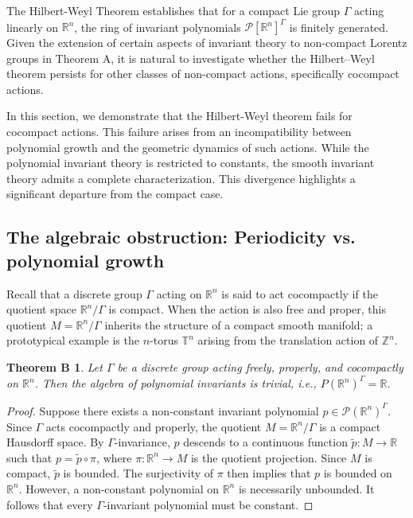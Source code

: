 \documentclass[]{article}
\newtheorem*{theoremB}{Theorem B}
\begin{document}
The Hilbert-Weyl Theorem establishes that for a compact Lie group $\Gamma$ acting linearly on $\mathbb{R}^n$, the ring of invariant polynomials $\mathcal{P}[\mathbb{R}^n]^\Gamma$ is finitely generated. Given the extension of certain aspects of invariant theory to non-compact Lorentz groups in Theorem A, it is natural to investigate whether the Hilbert–Weyl theorem persists for other classes of non-compact actions, specifically cocompact actions.

In this section, we demonstrate that the Hilbert-Weyl theorem fails for cocompact actions. This failure arises from an incompatibility between polynomial growth and the geometric dynamics of such actions. While the polynomial invariant theory is restricted to constants, the smooth invariant theory admits a complete characterization. This divergence highlights a significant departure from the compact case.

\subsection{The algebraic obstruction: Periodicity vs. polynomial growth}

Recall that a discrete group $\Gamma$ acting on $\mathbb{R}^n$ is said to act cocompactly if the quotient space $\mathbb{R}^n/\Gamma$ is compact. When the action is also free and proper, this quotient $M = \mathbb{R}^n/\Gamma$ inherits the structure of a compact smooth manifold; a prototypical example is the $n$-torus $\mathbb{T}^n$ arising from the translation action of $\mathbb{Z}^n$.

\begin{theoremB}
Let \( \Gamma \) be a discrete group acting freely, properly, and cocompactly on \( \mathbb{R}^n \). Then the algebra of polynomial invariants is trivial, i.e., \( P(\mathbb{R}^n)^\Gamma = \mathbb{R} \).
\end{theoremB}

\begin{proof}
	Suppose there exists a non-constant invariant polynomial $p \in \mathcal{P}(\mathbb{R}^n)^\Gamma$. Since $\Gamma$ acts cocompactly and properly, the quotient $M = \mathbb{R}^n/\Gamma$ is a compact Hausdorff space. By $\Gamma$-invariance, $p$ descends to a continuous function $\tilde{p}: M \to \mathbb{R}$ such that $p = \tilde{p} \circ \pi$, where $\pi: \mathbb{R}^n \to M$ is the quotient projection. Since $M$ is compact, $\tilde{p}$ is bounded. The surjectivity of $\pi$ then implies that $p$ is bounded on $\mathbb{R}^n$. However, a non-constant polynomial on $\mathbb{R}^n$ is necessarily unbounded. It follows that every $\Gamma$-invariant polynomial must be constant.
\end{proof}
\end{document}
